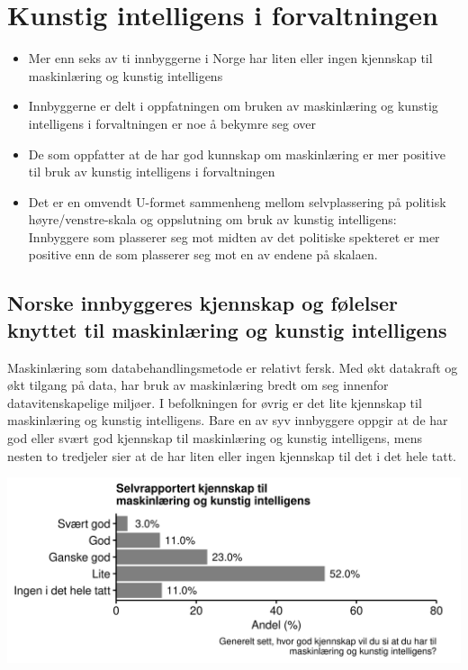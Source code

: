 \documentclass[
]{book}
\begin{document}
\hypertarget{kunstig-intelligens-i-forvaltningen}{%
\chapter{Kunstig intelligens i forvaltningen}\label{kunstig-intelligens-i-forvaltningen}}

\begin{itemize}
\item
  Mer enn seks av ti innbyggerne i Norge har liten eller ingen kjennskap til maskinlæring og kunstig intelligens
\item
  Innbyggerne er delt i oppfatningen om bruken av maskinlæring og kunstig intelligens i forvaltningen er noe å bekymre seg over
\item
  De som oppfatter at de har god kunnskap om maskinlæring er mer positive til bruk av kunstig intelligens i forvaltningen
\item
  Det er en omvendt U-formet sammenheng mellom selvplassering på politisk høyre/venstre-skala og oppslutning om bruk av kunstig intelligens:
  Innbyggere som plasserer seg mot midten av det politiske spekteret er mer positive enn de som plasserer seg mot en av endene på skalaen.
\end{itemize}

\hypertarget{norske-innbyggeres-kjennskap-og-fuxf8lelser-knyttet-til-maskinluxe6ring-og-kunstig-intelligens}{%
\section{Norske innbyggeres kjennskap og følelser knyttet til maskinlæring og kunstig intelligens}\label{norske-innbyggeres-kjennskap-og-fuxf8lelser-knyttet-til-maskinluxe6ring-og-kunstig-intelligens}}

Maskinlæring som databehandlingsmetode er relativt fersk.
Med økt datakraft og økt tilgang på data, har bruk av maskinlæring bredt om seg innenfor datavitenskapelige miljøer.
I befolkningen for øvrig er det lite kjennskap til maskinlæring og kunstig intelligens.
Bare en av syv innbyggere oppgir at de har god eller svært god kjennskap til maskinlæring og kunstig intelligens, mens nesten to tredjeler sier at de har liten eller ingen kjennskap til det i det hele tatt.

\includegraphics{figs/png/fig_ml_knowledge.png}
\end{document}
